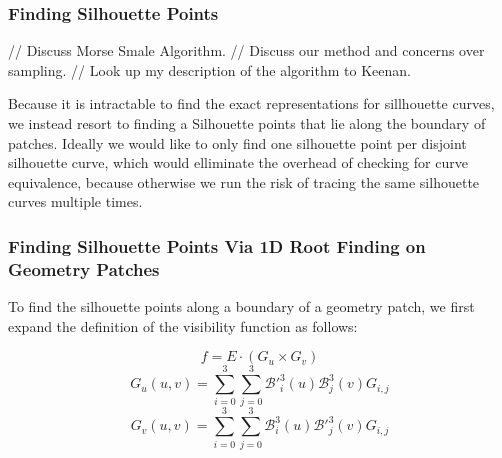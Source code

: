 \documentclass[12pt, letterpaper]{article}
\begin{document}


		\subsubsection{Finding Silhouette Points}
			\label{section:findingSilhouettePoints}

			// Discuss Morse Smale Algorithm.
			// Discuss our method and concerns over sampling.
			// Look up my description of the algorithm to Keenan.

			Because it is intractable to find the exact representations for sillhouette curves, we instead resort to finding a Silhouette points that 
			lie along the boundary of patches. Ideally we would like to only find one silhouette point per disjoint silhouette curve,
			which would elliminate the overhead of checking for curve equivalence,
			because otherwise we run the risk of tracing the same silhouette curves multiple times.



		\subsubsection{Finding Silhouette Points Via 1D Root Finding on Geometry Patches}
		\label{section:rootFindingGeometryPatch}

		To find the silhouette points along a boundary of a geometry patch, we first expand the definition of the visibility function as follows:

		$$ f = E \cdot (G_{u} \times G_{v}) $$
		$$ G_{u}(u, v) = \sum_{i=0}^{3} \sum_{j=0}^{3} \mathcal{B'}_{i}^{3}(u) \mathcal{B}_{j}^{3} (v) G_{i, j} $$
		$$ G_{v}(u, v) = \sum_{i=0}^{3} \sum_{j=0}^{3} \mathcal{B}_{i}^{3}(u)  \mathcal{B'}_{j}^{3} (v) G_{i, j} $$
\end{document}

